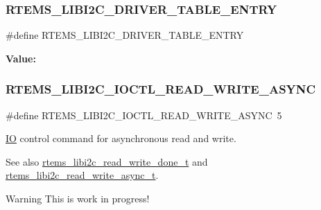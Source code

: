 \subsubsection{\texorpdfstring{RTEMS\_LIBI2C\_DRIVER\_TABLE\_ENTRY}{RTEMS\_LIBI2C\_DRIVER\_TABLE\_ENTRY}}
{\footnotesize\ttfamily \#define R\+T\+E\+M\+S\+\_\+\+L\+I\+B\+I2\+C\+\_\+\+D\+R\+I\+V\+E\+R\+\_\+\+T\+A\+B\+L\+E\+\_\+\+E\+N\+T\+RY}

{\bfseries Value\+:}
\begin{DoxyCode}{0}
\DoxyCodeLine{\{                                         \(\backslash\)}
\DoxyCodeLine{\}}

\end{DoxyCode}
\mbox{\label{group__libi2c_gadae8be7dedd12dba0ca853f7f041fc1b}} 
\subsubsection{\texorpdfstring{RTEMS\_LIBI2C\_IOCTL\_READ\_WRITE\_ASYNC}{RTEMS\_LIBI2C\_IOCTL\_READ\_WRITE\_ASYNC}}
{\footnotesize\ttfamily \#define R\+T\+E\+M\+S\+\_\+\+L\+I\+B\+I2\+C\+\_\+\+I\+O\+C\+T\+L\+\_\+\+R\+E\+A\+D\+\_\+\+W\+R\+I\+T\+E\+\_\+\+A\+S\+Y\+NC~5}



\mbox{\hyperlink{structIO}{IO}} control command for asynchronous read and write. 

\begin{DoxySeeAlso}{See also}
\mbox{\hyperlink{group__libi2c_gae9d3e463bdcf351a6d40952c9c57446c}{rtems\+\_\+libi2c\+\_\+read\+\_\+write\+\_\+done\+\_\+t}} and \mbox{\hyperlink{structrtems__libi2c__read__write__async__t}{rtems\+\_\+libi2c\+\_\+read\+\_\+write\+\_\+async\+\_\+t}}.
\end{DoxySeeAlso}
\begin{DoxyWarning}{Warning}
This is work in progress! 
\end{DoxyWarning}


